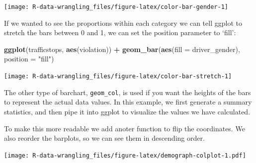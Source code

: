 \documentclass[]{book}
\newenvironment{Shaded}{\begin{snugshade}}{\end{snugshade}}
\newcommand{\CommentTok}[1]{\textcolor[rgb]{0.56,0.35,0.01}{\textit{#1}}}
\newcommand{\DataTypeTok}[1]{\textcolor[rgb]{0.13,0.29,0.53}{#1}}
\newcommand{\KeywordTok}[1]{\textcolor[rgb]{0.13,0.29,0.53}{\textbf{#1}}}
\newcommand{\NormalTok}[1]{#1}
\newcommand{\OperatorTok}[1]{\textcolor[rgb]{0.81,0.36,0.00}{\textbf{#1}}}
\newcommand{\OtherTok}[1]{\textcolor[rgb]{0.56,0.35,0.01}{#1}}
\newcommand{\StringTok}[1]{\textcolor[rgb]{0.31,0.60,0.02}{#1}}
\begin{document}
\texttt{[image: R-data-wrangling\_files/figure-latex/color-bar-gender-1]}

If we wanted to see the proportions within each category we can tell ggplot to stretch the bars between 0 and 1, we can set the position parameter to `fill':

\begin{Shaded}
\begin{Highlighting}[]
\KeywordTok{ggplot}\NormalTok{(trafficstops, }\KeywordTok{aes}\NormalTok{(violation)) }\OperatorTok{+}\StringTok{ }
\StringTok{  }\KeywordTok{geom_bar}\NormalTok{(}\KeywordTok{aes}\NormalTok{(}\DataTypeTok{fill =}\NormalTok{ driver_gender), }\DataTypeTok{position =} \StringTok{"fill"}\NormalTok{)}
\end{Highlighting}
\end{Shaded}

\texttt{[image: R-data-wrangling\_files/figure-latex/color-bar-stretch-1]}

The other type of barchart, \texttt{geom\_col}, is used if you want the heights of the bars to represent the actual data values. In this example, we first generate a summary statistics, and then pipe it into ggplot to visualize the values we have calculated.

To make this more readable we add anoter function to flip the coordinates. We also reorder the barplots, so we can see them in descending order.

\begin{Shaded}
\end{Shaded}

\texttt{[image: R-data-wrangling\_files/figure-latex/demograph-colplot-1.pdf]}
\end{document}
